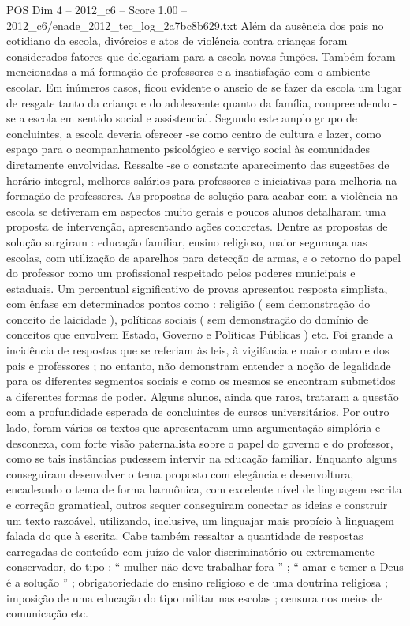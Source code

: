 \begin{textsample}{POS Dim 4 – 2012\_c6 – Score 1.00 – 2012\_c6/enade\_2012\_tec\_log\_2a7bc8b629.txt}
Além da ausência dos pais no cotidiano da escola, divórcios e atos de violência contra crianças foram considerados fatores que delegariam para a escola novas funções.
Também foram mencionadas a má formação de professores e a insatisfação com o ambiente escolar.
Em inúmeros casos, ficou evidente o anseio de se fazer da escola um lugar de resgate tanto da criança e do adolescente quanto da família, compreendendo -se a escola em sentido social e assistencial.
Segundo este amplo grupo de concluintes, a escola deveria oferecer -se como centro de cultura e lazer, como espaço para o acompanhamento psicológico e serviço social às comunidades diretamente envolvidas.
Ressalte -se o constante aparecimento das sugestões de horário integral, melhores salários para professores e iniciativas para melhoria na formação de professores.
As propostas de solução para acabar com a violência na escola se detiveram em aspectos muito gerais e poucos alunos detalharam uma proposta de intervenção, apresentando ações concretas.
Dentre as propostas de solução surgiram : educação familiar, ensino religioso, maior segurança nas escolas, com utilização de aparelhos para detecção de armas, e o retorno do papel do professor como um profissional respeitado pelos poderes municipais e estaduais.
Um percentual significativo de provas apresentou resposta simplista, com ênfase em determinados pontos como : religião ( sem demonstração do conceito de laicidade ), políticas sociais ( sem demonstração do domínio de conceitos que envolvem Estado, Governo e Politicas Públicas ) etc.
Foi grande a incidência de respostas que se referiam às leis, à vigilância e maior controle dos pais e professores ; no entanto, não demonstram entender a noção de legalidade para os diferentes segmentos sociais e como os mesmos se encontram submetidos a diferentes formas de poder.
Alguns alunos, ainda que raros, trataram a questão com a profundidade esperada de concluintes de cursos universitários.
Por outro lado, foram vários os textos que apresentaram uma argumentação simplória e desconexa, com forte visão paternalista sobre o papel do governo e do professor, como se tais instâncias pudessem intervir na educação familiar.
Enquanto alguns conseguiram desenvolver o tema proposto com elegância e desenvoltura, encadeando o tema de forma harmônica, com excelente nível de linguagem escrita e correção gramatical, outros sequer conseguiram conectar as ideias e construir um texto razoável, utilizando, inclusive, um linguajar mais propício à linguagem falada do que à escrita.
Cabe também ressaltar a quantidade de respostas carregadas de conteúdo com juízo de valor discriminatório ou extremamente conservador, do tipo : “ mulher não deve trabalhar fora ” ; “ amar e temer a Deus é a solução ” ; obrigatoriedade do ensino religioso e de uma doutrina religiosa ; imposição de uma educação do tipo militar nas escolas ; censura nos meios de comunicação etc.

\end{textsample}
